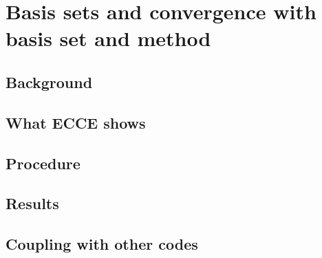 \chapter{Basis sets and convergence with basis set and method}
\label{ch:basis-sets}


\section{Background}

\section{What ECCE shows}

\section{Procedure}

\section{Results}

\section{Coupling with other codes}

